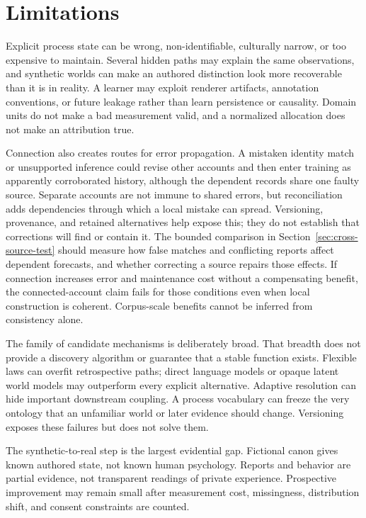 \documentclass[10pt]{article}
\begin{document}
\section{Limitations}
\label{sec:limitations}

Explicit process state can be wrong, non-identifiable, culturally narrow, or
too expensive to maintain. Several hidden paths may explain the same
observations, and synthetic worlds can make an authored distinction look more
recoverable than it is in reality. A learner may exploit renderer artifacts,
annotation conventions, or future leakage rather than learn persistence or
causality. Domain units do not make a bad measurement valid, and a normalized
allocation does not make an attribution true.

Connection also creates routes for error propagation. A mistaken identity
match or unsupported inference could revise other accounts and then enter
training as apparently corroborated history, although the dependent records
share one faulty source. Separate accounts are not immune to shared errors,
but reconciliation adds dependencies through which a local mistake can spread.
Versioning, provenance, and retained alternatives help expose this; they do
not establish that corrections will find or contain it. The bounded comparison
in Section~\ref{sec:cross-source-test} should measure how false matches and
conflicting reports affect dependent forecasts, and whether correcting a source
repairs those effects. If connection increases error and maintenance cost
without a compensating benefit, the connected-account claim fails for those
conditions even when local construction is coherent. Corpus-scale benefits
cannot be inferred from consistency alone.

The family of candidate mechanisms is deliberately broad. That breadth does
not provide a discovery algorithm or guarantee that a stable function exists.
Flexible laws can overfit retrospective paths; direct language models or
opaque latent world models may outperform every explicit alternative. Adaptive
resolution can hide important downstream coupling. A process vocabulary can
freeze the very ontology that an unfamiliar world or later evidence should
change. Versioning exposes these failures but does not solve them.

The synthetic-to-real step is the largest evidential gap. Fictional canon gives
known authored state, not known human psychology. Reports and behavior are
partial evidence, not transparent readings of private experience. Prospective
improvement may remain small after measurement cost, missingness, distribution
shift, and consent constraints are counted.
\end{document}
